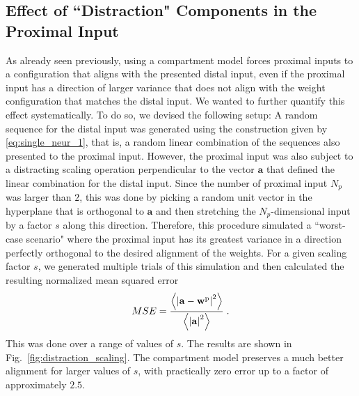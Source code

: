 \documentclass[10pt,a4paper]{article}
\begin{document}
\subsection{Effect of ``Distraction" Components in the Proximal Input}
As already seen previously, using a compartment model forces proximal inputs to a configuration that aligns with the presented distal input, even if the proximal input has a direction of larger variance that does not align with the weight configuration that matches the distal input. We wanted to further quantify this effect systematically. To do so, we devised the following setup: A random sequence for the distal input was generated using the construction given by \eqref{eq:single_neur_1}, that is, a random linear combination of the sequences also presented to the proximal input. However, the proximal input was also subject to a distracting scaling operation perpendicular to the vector $\mathbf{a}$ that defined the linear combination for the distal input. Since the number of proximal input $N_p$ was larger than $2$, this was done by picking a random unit vector in the hyperplane that is orthogonal to $\mathbf{a}$ and then stretching the $N_p$-dimensional input by a factor $s$ along this direction. Therefore, this procedure simulated a ``worst-case scenario" where the proximal input has its greatest variance in a direction perfectly orthogonal to the desired alignment of the weights. For a given scaling factor $s$, we generated multiple trials of this simulation and then calculated the resulting normalized mean squared error
\begin{equation}
	MSE = \frac{\left\langle \left\lvert \mathbf{a} - \mathbf{w}^{\rm p} \right\rvert^2\right\rangle}{\left\langle \left\lvert \mathbf{a}\right\rvert^2\right\rangle} \; .
\end{equation}
This was done over a range of values of $s$. The results are shown in Fig.~\ref{fig:distraction_scaling}. The compartment model preserves a much better alignment for larger values of $s$, with practically zero error up to a factor of approximately $2.5$.
\end{document}

